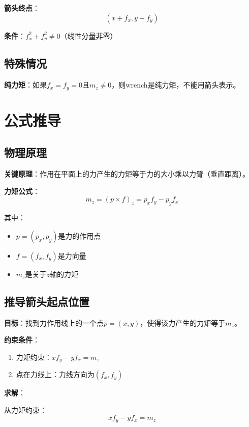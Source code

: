 \documentclass[12pt,a4paper]{article}
\begin{document}
\textbf{箭头终点}：
\begin{equation}
(x + f_x, y + f_y)
\label{eq:arrow_head}
\end{equation}

\textbf{条件}：$f_x^2 + f_y^2 \neq 0$（线性分量非零）

\subsection{特殊情况}

\textbf{纯力矩}：如果$f_x = f_y = 0$且$m_z \neq 0$，则wrench是纯力矩，不能用箭头表示。

\section{公式推导}

\subsection{物理原理}

\textbf{关键原理}：作用在平面上的力产生的力矩等于力的大小乘以力臂（垂直距离）。

\textbf{力矩公式}：
\begin{equation}
m_z = (p \times f)_z = p_x f_y - p_y f_x
\label{eq:moment_formula}
\end{equation}

其中：
\begin{itemize}
\item $p = (p_x, p_y)$是力的作用点
\item $f = (f_x, f_y)$是力向量
\item $m_z$是关于$z$轴的力矩
\end{itemize}

\subsection{推导箭头起点位置}

\textbf{目标}：找到力作用线上的一个点$p = (x, y)$，使得该力产生的力矩等于$m_z$。

\textbf{约束条件}：
\begin{enumerate}
\item 力矩约束：$x f_y - y f_x = m_z$
\item 点在力线上：力线方向为$(f_x, f_y)$
\end{enumerate}

\textbf{求解}：

从力矩约束：
\begin{equation}
x f_y - y f_x = m_z
\label{eq:moment_constraint}
\end{equation}
\end{document}
